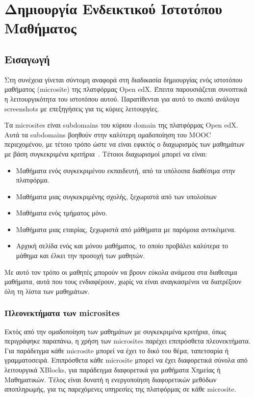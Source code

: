 \documentclass[12pt]{report}
\begin{document}
\chapter{Δημιουργία Ενδεικτικού Ιστοτόπου Μαθήματος}\label{ch4}
\section{Εισαγωγή}
Στη συνέχεια γίνεται σύντομη αναφορά στη διαδικασία δημιουργίας ενός ιστοτόπου μαθήματος (\textlatin{microsite}) της πλατφόρμας \textlatin{Open edX}. Έπειτα παρουσιάζεται συνοπτικά η λειτουργικότητα του ιστοτόπου αυτού. Παρατίθενται για αυτό το σκοπό ανάλογα \textlatin{screenshots} με επεξηγήσεις για τις κύριες λειτουργίες.

Τα \textlatin{microsites} είναι \textlatin{subdomains} του κύριου \textlatin{domain} της πλατφόρμας \textlatin{Open edX}. Αυτά τα \textlatin{subdomains} βοηθούν στην καλύτερη ομαδοποίηση του \textlatin{MOOC} περιεχομένου, με τέτοιο τρόπο ώστε να είναι εφικτός ο διαχωρισμός των μαθημάτων με βάση συγκεκριμένα κριτήρια~\cite{microsites_2}. Τέτοιοι διαχωρισμοί μπορεί να είναι:
\begin{itemize}
  \item Μαθήματα ενός συγκεκριμένου εκπαιδευτή, από τα υπόλοιπα διαθέσιμα στην πλατφόρμα.
  \item Μαθήματα μιας συγκεκριμένης σχολής, ξεχωριστά από των υπολοίπων
  \item Μαθήματα ενός τμήματος μόνο.
  \item Μαθήματα μιας εταιρίας, ξεχωριστά από μάθήματα με παρόμοια αντικέιμενα.
  \item Αρχική σελίδα ενός και μόνου μαθήματος, το οποίο προβάλει καλύτερα το μάθημα και έλκει την προσοχή των μαθητών.
\end{itemize}
Με αυτό τον τρόπο οι μαθητές μπορούν να βρουν εύκολα ανάμεσα στα διαθεσιμα μαθήματα, αυτά που τους ενδιαφέρουν, χωρίς να είναι αναγκασμένοι να διατρέξουν όλη τη λίστα των μαθημάτων.

\subsection{Πλεονεκτήματα των \textlatin{microsites}}
Εκτός από την ομαδοποίηση των μαθημάτων με συγκεκριμένα κριτήρια, όπως περιγράφηκε παραπάνω, η χρήση των \textlatin{microsites} παρέχει επιπρόσθετα πλεονεκτήματα. Για παράδειγμα κάθε \textlatin{microsite} μπορεί να έχει το δικό του θέμα, ταπετσαρία ή γραμματοσειρά. Επιπρόσθετα κάθε \textlatin{microsite} μπορεί να έχει διαφορετικά σύνολα από λειτουργικά \textlatin{XBlocks}, για παράδειγμα διαφορετικά για μαθήματα Χημείας ή Μαθηματικών. Τέλος είναι δυνατή η ενεργοποίηση διαφορετικών μεθόδων αποπληρωμής, για τις παρεχόμενες υπηρεσίες της πλατφόρμας σε κάθε \textlatin{microsite}.
\end{document}
